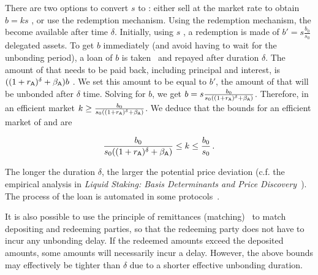 There are two options to convert $s$ \stasset to \asset: either sell
at the market rate to obtain $b = k s$ \asset, or use the redemption mechanism.
Using the redemption mechanism, the \assets become available after
time $\delta$.
Initially, using $s$ \stasset, a redemption is made of $b' = s \frac{b_0}{s_0}$
delegated assets. To get $b$ \asset immediately (and avoid having to wait
for the unbonding period), a loan of $b$ \asset is taken~\cite[p.~13]{liquid-staking-report} and
repayed after duration $\delta$.
The amount of \asset that needs to be paid back,
including principal and interest, is $((1 + r_{\textsf{A}})^\delta + \beta_{\textsf{A}})b$ \asset.
We set this amount to be equal to $b'$, the amount of \assets that will be
unbonded after $\delta$ time. Solving for $b$, we get
$b = s \frac{b_0}{s_0 ((1 + r_{\textsf{A}})^\delta + \beta_{\textsf{A}})}$.
Therefore, in an efficient market $k \geq \frac{b_0}{s_0 ((1 + r_{\textsf{A}})^\delta + \beta_{\textsf{A}})}$.
We deduce that the bounds for an efficient market of \asset and \stasset are

\[
  \frac{b_0}{s_0 ((1 + r_{\textsf{A}})^\delta + \beta_{\textsf{A}})} \leq k \leq \frac{b_0}{s_0}\,.
\]

The longer the duration $\delta$, the larger the potential price deviation
(c.f. the empirical analysis in
\emph{Liquid Staking: Basis Determinants and Price Discovery}~\cite{scharnowski2022liquid}).
The process of the loan is automated in some protocols~\cite[\S5]{parallel}\cite{marinade-matching}.

It is also possible to use the principle of remittances
(matching)~\cite[\S5]{parallel}\cite{marinade-matching} to match depositing and
redeeming parties, so that the redeeming party does not have to incur any unbonding delay.
If the redeemed amounts exceed the deposited amounts, some amounts will necessarily incur
a delay. However, the above bounds may effectively be tighter than $\delta$ due to
a shorter effective unbonding duration.

